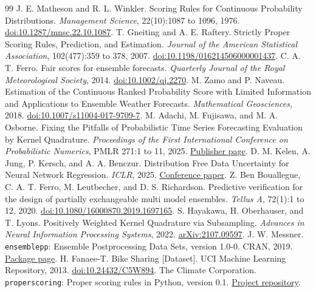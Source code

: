 \documentclass[11pt]{article}
\begin{document}
\begin{thebibliography}{99}
 J. E. Matheson and R. L. Winkler. Scoring Rules for Continuous Probability Distributions. \emph{Management Science}, 22(10):1087 to 1096, 1976. \href{https://doi.org/10.1287/mnsc.22.10.1087}{doi:10.1287/mnsc.22.10.1087}.
 T. Gneiting and A. E. Raftery. Strictly Proper Scoring Rules, Prediction, and Estimation. \emph{Journal of the American Statistical Association}, 102(477):359 to 378, 2007. \href{https://doi.org/10.1198/016214506000001437}{doi:10.1198/016214506000001437}.
 C. A. T. Ferro. Fair scores for ensemble forecasts. \emph{Quarterly Journal of the Royal Meteorological Society}, 2014. \href{https://doi.org/10.1002/qj.2270}{doi:10.1002/qj.2270}.
 M. Zamo and P. Naveau. Estimation of the Continuous Ranked Probability Score with Limited Information and Applications to Ensemble Weather Forecasts. \emph{Mathematical Geosciences}, 2018. \href{https://doi.org/10.1007/s11004-017-9709-7}{doi:10.1007/s11004-017-9709-7}.
 M. Adachi, M. Fujisawa, and M. A. Osborne. Fixing the Pitfalls of Probabilistic Time Series Forecasting Evaluation by Kernel Quadrature. \emph{Proceedings of the First International Conference on Probabilistic Numerics}, PMLR 271:1 to 11, 2025. \href{https://proceedings.mlr.press/v271/adachi25a.html}{Publisher page}.
 D. M. Kelen, A. Jung, P. Kersch, and A. A. Benczur. Distribution Free Data Uncertainty for Neural Network Regression. \emph{ICLR}, 2025. \href{https://proceedings.iclr.cc/paper_files/paper/2025/hash/3eceb70f47690051d6769739fbf6294b-Abstract-Conference.html}{Conference paper}.
 Z. Ben Bouallegue, C. A. T. Ferro, M. Leutbecher, and D. S. Richardson. Predictive verification for the design of partially exchangeable multi model ensembles. \emph{Tellus A}, 72(1):1 to 12, 2020. \href{https://doi.org/10.1080/16000870.2019.1697165}{doi:10.1080/16000870.2019.1697165}.
 S. Hayakawa, H. Oberhauser, and T. Lyons. Positively Weighted Kernel Quadrature via Subsampling. \emph{Advances in Neural Information Processing Systems}, 2022. \href{https://arxiv.org/abs/2107.09597}{arXiv:2107.09597}.
 J. W. Messner. \texttt{ensemblepp}: Ensemble Postprocessing Data Sets, version 1.0-0. CRAN, 2019. \href{https://cran.r-project.org/package=ensemblepp}{Package page}.
 H. Fanaee-T. Bike Sharing [Dataset]. UCI Machine Learning Repository, 2013. \href{https://doi.org/10.24432/C5W894}{doi:10.24432/C5W894}.
 The Climate Corporation. \texttt{properscoring}: Proper scoring rules in Python, version 0.1. \href{https://github.com/properscoring/properscoring}{Project repository}.

\end{thebibliography}
\end{document}
